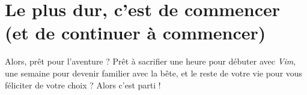 \section{Le plus dur, c'est de commencer (et de continuer à commencer)}

Alors, prêt pour l'aventure ? Prêt à sacrifier une heure pour débuter avec \emph{Vim}, une semaine pour devenir familier avec la bête, et le reste de votre vie pour vous féliciter de votre choix ? Alors c'est parti !


\mainmatter



\printindex


